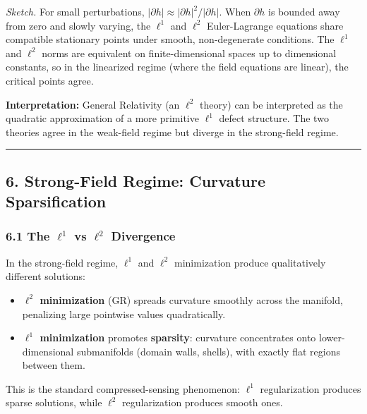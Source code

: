 \documentclass[
]{article}
\providecommand{\tightlist}{%
  \setlength{\itemsep}{0pt}\setlength{\parskip}{0pt}}
\begin{document}
\emph{Sketch.} For small perturbations,
\(|\partial h| \approx |\partial h|^2 / |\partial h|\). When
\(\partial h\) is bounded away from zero and slowly varying, the
\(\ell^1\) and \(\ell^2\) Euler-Lagrange equations share compatible
stationary points under smooth, non-degenerate conditions. The
\(\ell^1\) and \(\ell^2\) norms are equivalent on finite-dimensional
spaces up to dimensional constants, so in the linearized regime (where
the field equations are linear), the critical points agree.

\textbf{Interpretation:} General Relativity (an \(\ell^2\) theory) can
be interpreted as the quadratic approximation of a more primitive
\(\ell^1\) defect structure. The two theories agree in the weak-field
regime but diverge in the strong-field regime.

\begin{center}\rule{0.5\linewidth}{0.5pt}\end{center}

\subsection{6. Strong-Field Regime: Curvature
Sparsification}\label{strong-field-regime-curvature-sparsification}

\subsubsection{\texorpdfstring{6.1 The \(\ell^1\) vs \(\ell^2\)
Divergence}{6.1 The \textbackslash ell\^{}1 vs \textbackslash ell\^{}2 Divergence}}\label{the-ell1-vs-ell2-divergence}

In the strong-field regime, \(\ell^1\) and \(\ell^2\) minimization
produce qualitatively different solutions:

\begin{itemize}
\tightlist
\item
  \textbf{\(\ell^2\) minimization} (GR) spreads curvature smoothly
  across the manifold, penalizing large pointwise values quadratically.
\item
  \textbf{\(\ell^1\) minimization} promotes \textbf{sparsity}: curvature
  concentrates onto lower-dimensional submanifolds (domain walls,
  shells), with exactly flat regions between them.
\end{itemize}

This is the standard compressed-sensing phenomenon: \(\ell^1\)
regularization produces sparse solutions, while \(\ell^2\)
regularization produces smooth ones.
\end{document}
